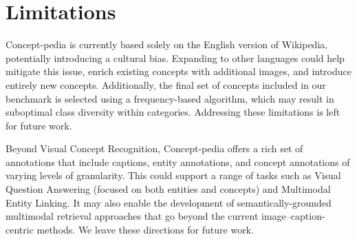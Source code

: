 \documentclass[11pt]{article}
\newcommand{\resource}{Concept-pedia}
\newcommand{\benchmark}{Concept-10k}
\begin{document}
\section*{Limitations}
\resource{} is currently based solely on the English version of Wikipedia, potentially introducing a cultural bias. 
Expanding to other languages could help mitigate this issue, enrich existing concepts with additional images, and introduce entirely new concepts. 
Additionally, the final set of concepts included in our benchmark is selected using a frequency-based algorithm, which may result in suboptimal class diversity within categories. 
Addressing these limitations is left for future work.

Beyond Visual Concept Recognition, \resource{} offers a rich set of annotations that include captions, entity annotations, and concept annotations of varying levels of granularity. This could support a range of tasks such as Visual Question Answering (focused on both entities and concepts) and Multimodal Entity Linking. 
It may also enable the development of semantically-grounded multimodal retrieval approaches that go beyond the current image–caption-centric methods. We leave these directions for future work.
\end{document}
